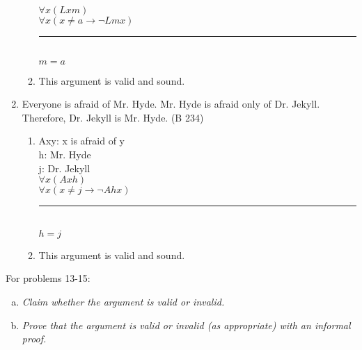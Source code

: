\documentclass{article}
\begin{document}
\begin{enumerate}
\begin{enumerate}
                        $\forall x(Lxm)$\\
                        $\forall x(x \neq a \to \neg Lmx)$\\
                        \rule{15em}{.5pt}\\
                        $m=a$
                  \item This argument is valid and sound.
            \end{enumerate}
      \item Everyone is afraid of Mr. Hyde. Mr. Hyde is afraid only of Dr. Jekyll. Therefore, Dr. Jekyll is Mr. Hyde. (B 234)
            \begin{enumerate}
                  \item Axy: x is afraid of y\\
                        h: Mr. Hyde\\
                        j: Dr. Jekyll\\

                        $\forall x(Axh)$\\
                        $\forall x (x \neq j \to \neg Ahx)$\\
                        \rule{15em}{.5pt}\\
                        $h=j$
                  \item This argument is valid and sound.
            \end{enumerate}
\end{enumerate}

\begin{flushleft}
      For problems 13-15:
\end{flushleft}
\begin{enumerate}[(a)]
      \item \textit{Claim whether the argument is valid or invalid.}
      \item \textit{Prove that the argument is valid or invalid (as appropriate) with an informal proof.}
\end{enumerate}
\end{document}
